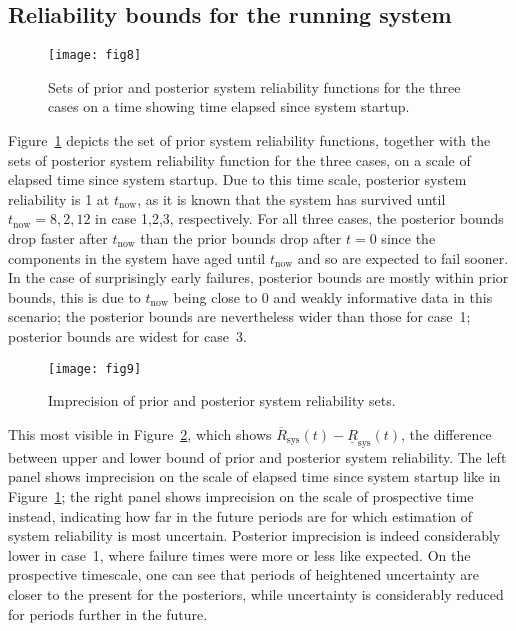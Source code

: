 \documentclass[Journal,SectionNumbers,InsideFigs]{ascelike}
\newcommand{\ul}[1]{\underline{#1}}
\newcommand{\ol}[1]{\overline{#1}}
\newcommand{\lRsys}{\ul{R}_\text{sys}}
\newcommand{\uRsys}{\ol{R}_\text{sys}}
\def\tnow{t_\text{now}}
\begin{document}
\subsection{Reliability bounds for the running system}
\label{sec:ex-sysrel}

\begin{figure}
\texttt{[image: fig8]}
\caption{Sets of prior and posterior system reliability functions for the three cases
on a time showing time elapsed since system startup.}
\label{fig:brake-sysrels}
\end{figure}
%
Figure~\ref{fig:brake-sysrels} depicts the set of prior system reliability functions,
together with the sets of posterior system reliability function for the three cases,
on a scale of elapsed time since system startup.
Due to this time scale, posterior system reliability is 1 at $\tnow$,
as it is known that the system has survived until $\tnow = 8, 2, 12$ in case 1,2,3, respectively.
For all three cases, the posterior bounds drop faster after $\tnow$ than the prior bounds drop after $t = 0$
since the components in the system have aged until $\tnow$ and so are expected to fail sooner.
In the case of surprisingly early failures, posterior bounds are mostly within prior bounds,
this is due to $\tnow$ being close to $0$ and weakly informative data in this scenario;
the posterior bounds are nevertheless wider than those for case~1;
posterior bounds are widest for case~3.
%
\begin{figure}
\texttt{[image: fig9]}
\caption{Imprecision of prior and posterior system reliability sets.}
\label{fig:brake-sysrels-imprecision}
\end{figure}
%
This most visible in Figure~\ref{fig:brake-sysrels-imprecision},
which shows $\uRsys(t) - \lRsys(t)$, the difference between upper and lower bound
of prior and posterior system reliability.
The left panel shows imprecision on the scale of elapsed time since system startup like in Figure~\ref{fig:brake-sysrels};
the right panel shows imprecision on the scale of prospective time instead,
indicating how far in the future periods are for which estimation of system reliability is most uncertain.
Posterior imprecision is indeed considerably lower in case~1,
where failure times were more or less like expected.
On the prospective timescale, one can see that periods of heightened uncertainty are closer to the present for the posteriors,
while uncertainty is considerably reduced for periods further in the future.
\end{document}
